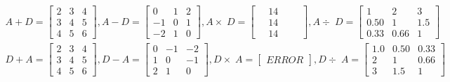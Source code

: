 \documentclass[UTF8,a4paper,notitlepage,openany,plain,final]{ctexbook}
\begin{document}
    \[ \begin{split}
        A + D =
        \begin{bmatrix}
            2 & 3 & 4 \\
            3 & 4 & 5 \\
            4 & 5 & 6
        \end{bmatrix}
        , A - D =
        \begin{bmatrix}
             0 & 1 & 2 \\
            -1 & 0 & 1 \\
            -2 & 1 & 0
        \end{bmatrix}
        , A \times\; D =
        \begin{bmatrix}
            \quad 14 \quad\quad \\
            \quad 14 \quad\quad \\
            \quad 14 \quad\quad
        \end{bmatrix}
        , A \div\; D =
        \begin{bmatrix}
            1    & 2    & 3   \\
            0.50 & 1    & 1.5 \\
            0.33 & 0.66 & 1
        \end{bmatrix}
        \\
        D + A =
        \begin{bmatrix}
            2 & 3 & 4 \\
            3 & 4 & 5 \\
            4 & 5 & 6
        \end{bmatrix}
        , D - A =
        \begin{bmatrix}
             0 & -1 & -2 \\
             1 &  0 & -1 \\
             2 &  1 &  0
        \end{bmatrix}
        , D \times\; A =
        \begin{bmatrix}
            ERROR
        \end{bmatrix}
        , D \div\; A =
        \begin{bmatrix}
            1.0 & 0.50  & 0.33 \\
            2   & 1     & 0.66 \\
            3   & 1.5   & 1
        \end{bmatrix}
    \end{split} \]
\end{document}
